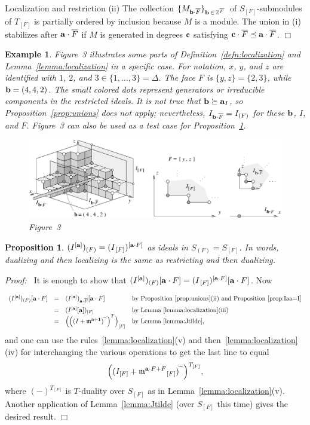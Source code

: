 \documentclass[12pt,leqno]{article}
\newtheorem{prop}[thm]{Proposition}
\newtheorem{example}[thm]{Example}
\def\aa{{{\rm \bf a}}}
\def\bb{{{\rm \bf b}}}
\def\cc{{{\rm \bf c}}}
\def\mm{{\mathfrak m}}
\def\ZZ{{\mathbb Z}}
\begin{document}
\begin{section}{Localization and restriction}
\vskip 1mm \noindent
(ii) The collection $\{M_{\bb \cdot \overline{F}}\}_{\bb\,\in\,
\ZZ^{\overline F}}\,$ of $S_{[F]}$-submodules of $T_{[F]}$ is partially
ordered by inclusion because $M$ is a module.  The union in (i)
stabilizes after $\aa \cdot \overline{F}$ if $M$ is generated in degrees
$\cc$ satisfying $\cc \cdot \overline{F} \preceq \aa \cdot \overline{F}$.
%
\hfill
$\Box$
\begin{example}\rm
Figure~3 illustrates some parts of Definition~\ref{defn:localization} and
Lemma~\ref{lemma:localization} in a specific case.  For notation, $x$,
$y$, and $z$ are identified with $1$, $2$, and $3 \in \{1,\ldots,3\} =
\Delta$.  The face $F$ is $\{y,z\} = \{2,3\}$, while $\bb = (4,4,2)$.
The small colored dots represent generators or irreducible components in
the restricted ideals.  It is not true that $\bb \succeq \aa_I$, so
Proposition~\ref{prop:unions} does not apply; nevertheless, $I_{\bb \cdot
{\overline F}} = I_{(F)}$ for these $\bb$, $I$, and $F$.  Figure~3 can
also be used as a test case for Proposition~\ref{prop:restrict-localize}.

\begin{figure}
\centering \includegraphics{localization}\\
Figure~3
\end{figure}
\end{example}
\begin{prop} \label{prop:restrict-localize}
$(I^{[\aa]})_{(F)} = (I_{\,[F]})^{[\aa \cdot F]}$ as ideals in $S_{(F)} =
S_{[F]}$.  In words, dualizing and then localizing is the same as
restricting and then dualizing.
\end{prop}
{\it Proof:\ } It is enough to show that $(I^{[\aa]})_{(F)}[\aa \cdot F]
= (I_{\,[F]})^{[\aa \cdot F]}[\aa \cdot F]$.  Now
$$
\begin{array}{rcll}
(I^{[\aa]})_{(F)}[\aa \cdot F]
& = &
	(I^{[\aa]})_{\aa \cdot \overline{F}}[\aa \cdot F]
	\phantom{\biggl(\biggr)}
&	\hbox{by Proposition~\ref{prop:unions}(ii) and
		Proposition~\ref{prop:Iaa=I}}
\cr
& = &
	(I^{[\aa]}[\aa])_{[F]}
&	\hbox{by Lemma~\ref{lemma:localization}(iii)}
\cr
& = &
	\Bigl(\Bigl((I + \mm^{\aa + {\bf 1}})\!\widetilde{\phantom{ii}}
	\Bigr)^T\Bigr)_{[F]}
&	\hbox{by Lemma~\ref{lemma:Jtilde},}
\cr
\end{array}
$$
and one can use the rules~\ref{lemma:localization}(v) and
then~\ref{lemma:localization}(iv) for interchanging the various
operations to get the last line to equal
$$
  \Bigl((I_{[F]} + \mm^{\aa \cdot F + F}{}_{[F]})\!\widetilde{\phantom{ii}}
  \Bigr)^{T_{[F]}},
$$
where $(-)^{T_{[F]}}$ is $T$-duality over $S_{[F]}$ as in
Lemma~\ref{lemma:localization}(v).  Another application of
Lemma~\ref{lemma:Jtilde} (over $S_{[F]}$ this time) gives the desired
result.
%
\hfill
$\Box$


\end{section}
\end{document}
